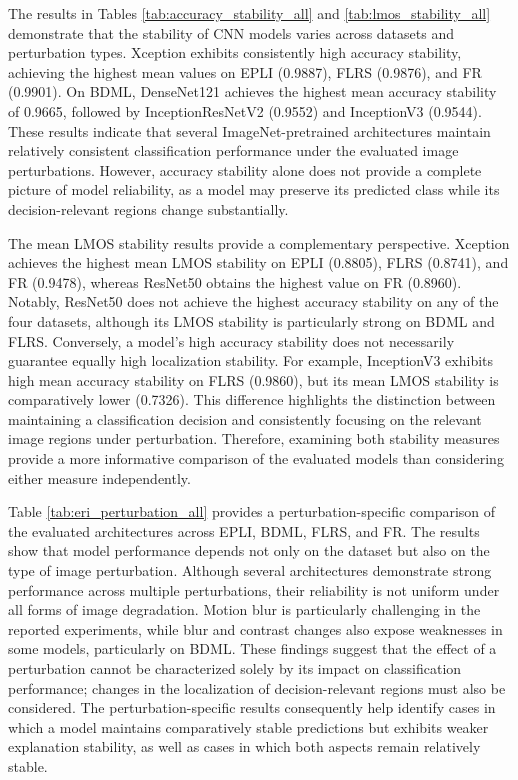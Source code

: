 \documentclass[a4paper,fleqn]{cas-dc}
\begin{document}
The results in Tables \ref{tab:accuracy_stability_all} and \ref{tab:lmos_stability_all} demonstrate that the stability of CNN models varies across datasets and perturbation types. Xception exhibits consistently high accuracy stability, achieving the highest mean values on EPLI (0.9887), FLRS (0.9876), and FR (0.9901). On BDML, DenseNet121 achieves the highest mean accuracy stability of 0.9665, followed by InceptionResNetV2 (0.9552) and InceptionV3 (0.9544). These results indicate that several ImageNet-pretrained architectures maintain relatively consistent classification performance under the evaluated image perturbations. However, accuracy stability alone does not provide a complete picture of model reliability, as a model may preserve its predicted class while its decision-relevant regions change substantially.

The mean LMOS stability results provide a complementary perspective. Xception achieves the highest mean LMOS stability on EPLI (0.8805), FLRS (0.8741), and FR (0.9478), whereas ResNet50 obtains the highest value on FR (0.8960). Notably, ResNet50 does not achieve the highest accuracy stability on any of the four datasets, although its LMOS stability is particularly strong on BDML and FLRS. Conversely, a model's high accuracy stability does not necessarily guarantee equally high localization stability. For example, InceptionV3 exhibits high mean accuracy stability on FLRS (0.9860), but its mean LMOS stability is comparatively lower (0.7326). This difference highlights the distinction between maintaining a classification decision and consistently focusing on the relevant image regions under perturbation. Therefore, examining both stability measures provide a more informative comparison of the evaluated models than considering either measure independently.

Table \ref{tab:eri_perturbation_all} provides a perturbation-specific comparison of the evaluated architectures across EPLI, BDML, FLRS, and FR. The results show that model performance depends not only on the dataset but also on the type of image perturbation. Although several architectures demonstrate strong performance across multiple perturbations, their reliability is not uniform under all forms of image degradation. Motion blur is particularly challenging in the reported experiments, while blur and contrast changes also expose weaknesses in some models, particularly on BDML. These findings suggest that the effect of a perturbation cannot be characterized solely by its impact on classification performance; changes in the localization of decision-relevant regions must also be considered. The perturbation-specific results consequently help identify cases in which a model maintains comparatively stable predictions but exhibits weaker explanation stability, as well as cases in which both aspects remain relatively stable.
\end{document}
